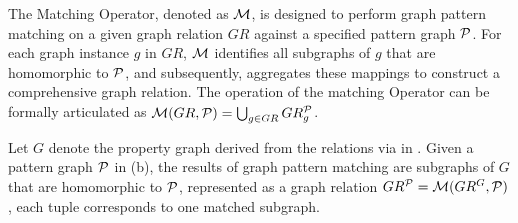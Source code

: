 

\begin{definition}
    \label{def:matching}
    The Matching Operator, denoted as \(\mathcal{M}\), is designed to perform graph pattern matching on a given graph relation \(GR\) against a specified pattern graph \(\mathcal{P}\). For each graph instance \(g\) in \(GR\), \(\mathcal{M}\) identifies all subgraphs of \(g\) that are homomorphic to \(\mathcal{P}\), and subsequently, aggregates these mappings to construct a comprehensive graph relation. The operation of the matching Operator can be formally articulated as \(\mathcal{M}(GR, \mathcal{P}) = \bigcup_{g \in GR} GR_g^{\mathcal{P}}\).%
\end{definition}

\begin{example}
    \label{ex:matching}
    Let \(G\) denote the property graph derived from the relations via \rgmapping in .
    Given a pattern graph \(\mathcal{P}\) in (b), the results of graph pattern matching are subgraphs of \(G\) that are homomorphic to \(\mathcal{P}\), represented as a graph relation \(GR^{\mathcal{P}} = \mathcal{M}(GR^{G}, \mathcal{P})\), each tuple corresponds to one matched subgraph.
\end{example}

